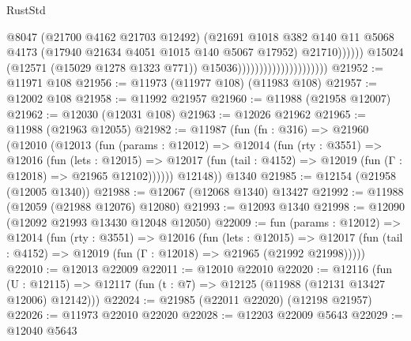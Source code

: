 \begin{lexlean}{RustStd}
\begin{coremodule}
                                                        @8047
                                                        (@21700 @4162 @21703 @12492)
                                                        (@21691
                                                          @1018
                                                          @382
                                                          @140
                                                          @11
                                                          @5068
                                                          @4173
                                                          (@17940
                                                            @21634
                                                            @4051
                                                            @1015
                                                            @140
                                                            @5067
                                                            @17952)
                                                          @21710))))))
                                              @15024
                                              (@12571 (@15029 @1278 @1323 @771))
                                              @15036)))))))))))))))))))))
@21952 := @11971 @108
@21956 := @11973 (@11977 @108) (@11983 @108)
@21957 := @12002 @108
@21958 := @11992 @21957
@21960 := @11988 (@21958 @12007)
@21962 := @12030 (@12031 @108)
@21963 := @12026 @21962
@21965 := @11988 (@21963 @12055)
@21982 := @11987
    (fun (fn : @316) =>
    @21960
      (@12010
        (@12013
          (fun (params : @12012) =>
          @12014
            (fun (rty : @3551) =>
            @12016
              (fun (lets : @12015) =>
              @12017 (fun (tail : @4152) => @12019 (fun (Γ : @12018) => @21965 @12102))))))
        @12148))
    @1340
@21985 := @12154 (@21958 (@12005 @1340))
@21988 := @12067 (@12068 @1340) @13427
@21992 := @11988 (@12059 (@21988 @12076) @12080)
@21993 := @12093 @1340
@21998 := @12090 (@12092 @21993 @13430 @12048 @12050)
@22009 := fun (params : @12012) =>
  @12014
    (fun (rty : @3551) =>
    @12016
      (fun (lets : @12015) =>
      @12017 (fun (tail : @4152) => @12019 (fun (Γ : @12018) => @21965 (@21992 @21998)))))
@22010 := @12013 @22009
@22011 := @12010 @22010
@22020 := @12116
    (fun (U : @12115) => @12117 (fun (t : @7) => @12125 (@11988 (@12131 @13427 @12006) @12142)))
@22024 := @21985 (@22011 @22020) (@12198 @21957)
@22026 := @11973 @22010 @22020
@22028 := @12203 @22009 @5643
@22029 := @12040 @5643

\end{coremodule}
\end{lexlean}
